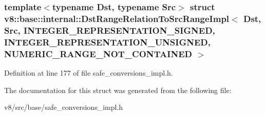 \subsubsection*{template$<$typename Dst, typename Src$>$\newline
struct v8\+::base\+::internal\+::\+Dst\+Range\+Relation\+To\+Src\+Range\+Impl$<$ Dst, Src, I\+N\+T\+E\+G\+E\+R\+\_\+\+R\+E\+P\+R\+E\+S\+E\+N\+T\+A\+T\+I\+O\+N\+\_\+\+S\+I\+G\+N\+E\+D, I\+N\+T\+E\+G\+E\+R\+\_\+\+R\+E\+P\+R\+E\+S\+E\+N\+T\+A\+T\+I\+O\+N\+\_\+\+U\+N\+S\+I\+G\+N\+E\+D, N\+U\+M\+E\+R\+I\+C\+\_\+\+R\+A\+N\+G\+E\+\_\+\+N\+O\+T\+\_\+\+C\+O\+N\+T\+A\+I\+N\+E\+D $>$}



Definition at line 177 of file safe\+\_\+conversions\+\_\+impl.\+h.



The documentation for this struct was generated from the following file\+:\begin{DoxyCompactItemize}
\item 
v8/src/base/safe\+\_\+conversions\+\_\+impl.\+h\end{DoxyCompactItemize}
